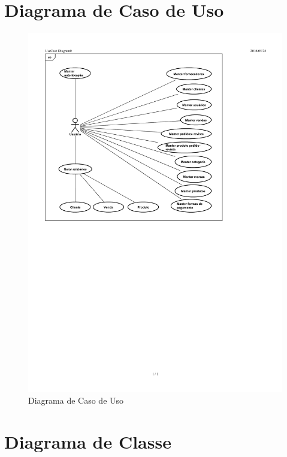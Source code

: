\documentclass[chapter=TITLE,12pt,oneside,a4paper,english,french,sumario=tradicional,spanish,brazil,]{abntex2}
\begin{document}
\section{Diagrama de Caso de Uso}
\begin{figure}[!htpb]\centering
	\includegraphics[scale=1.2]{uc.pdf}\caption{Diagrama de Caso de Uso}
\end{figure}

\section{Diagrama de Classe}
\end{document}

